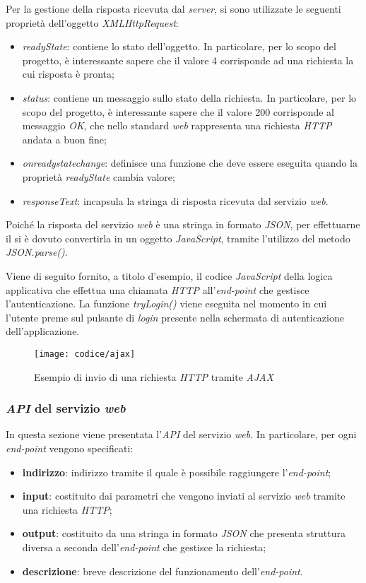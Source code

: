 Per la gestione della risposta ricevuta dal \textit{server}, si sono utilizzate le seguenti proprietà dell'oggetto \textit{XMLHttpRequest}:
\begin{itemize}
	\item \textit{readyState}: contiene lo stato dell'oggetto. In particolare, per lo scopo del progetto, è interessante sapere che il valore 4 corrisponde ad una richiesta la cui risposta è pronta;
	\item  \textit{status}: contiene un messaggio sullo stato della richiesta. In particolare, per lo scopo del progetto, è interessante sapere che il valore 200 corrisponde al messaggio \textit{OK}, che nello standard \textit{web} rappresenta una richiesta \textit{HTTP} andata a buon fine;
	\item \textit{onreadystatechange}: definisce una funzione che deve essere eseguita quando la proprietà \textit{readyState} cambia valore;
	\item \textit{responseText}: incapsula la stringa di risposta ricevuta dal servizio \textit{web}. 
\end{itemize} 
Poiché la risposta del servizio \textit{web} è una stringa in formato \textit{JSON}, per effettuarne il  si è dovuto convertirla in un oggetto \textit{JavaScript}, tramite l'utilizzo del metodo \textit{JSON.parse()}.

Viene di seguito fornito, a titolo d'esempio, il codice \textit{JavaScript} della logica applicativa che effettua una chiamata \textit{HTTP} all'\textit{end-point} che gestisce l'autenticazione. La funzione \textit{tryLogin()} viene eseguita nel momento in cui l'utente preme sul pulsante di \textit{login} presente nella schermata di autenticazione dell'applicazione.

\newpage

\begin{figure}[!h] 
    \centering 
    \texttt{[image: codice/ajax]} 
    \caption{Esempio di invio di una richiesta \textit{HTTP} tramite \textit{AJAX}}
\end{figure}

\subsubsection{\textit{API} del servizio \textit{web}} \label{api}

In questa sezione viene presentata l'\textit{API} del servizio \textit{web}. In particolare, per ogni \textit{end-point} vengono specificati:
\begin{itemize}
	\item \textbf{indirizzo}: indirizzo tramite il quale è possibile raggiungere l'\textit{end-point};
	\item \textbf{input}: costituito dai parametri che vengono inviati al servizio \textit{web} tramite una richiesta \textit{HTTP};
	\item \textbf{output}: costituito da una stringa in formato \textit{JSON} che presenta struttura diversa a seconda dell'\textit{end-point} che gestisce la richiesta;
	\item \textbf{descrizione}: breve descrizione del funzionamento dell'\textit{end-point}.
\end{itemize}


